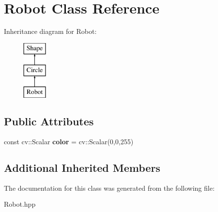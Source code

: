 \hypertarget{class_robot}{}\section{Robot Class Reference}
\label{class_robot}
Inheritance diagram for Robot\+:\begin{figure}[H]
\begin{center}
\leavevmode
\includegraphics[height=3.000000cm]{class_robot}
\end{center}
\end{figure}
\subsection*{Public Attributes}
\begin{DoxyCompactItemize}
\item 
\mbox{\label{class_robot_a8f89b1b5df8f5e247e608787923fe06c}} 
const cv\+::\+Scalar {\bfseries color} = cv\+::\+Scalar(0,0,255)
\end{DoxyCompactItemize}
\subsection*{Additional Inherited Members}


The documentation for this class was generated from the following file\+:\begin{DoxyCompactItemize}
\item 
Robot.\+hpp\end{DoxyCompactItemize}
